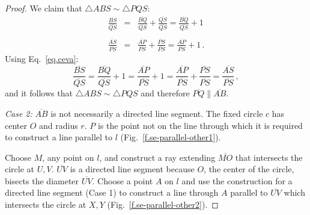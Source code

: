 \begin{proof}
We claim that $\triangle ABS \sim \triangle PQS$:
\begin{eqnarray*}
\frac{\overline{BS}}{\overline{QS}}&=&\frac{\overline{BQ}}{\overline{QS}}+\frac{\overline{QS}}{\overline{QS}} = \frac{\overline{BQ}}{\overline{QS}}+1\\
&&\\
\frac{\overline{AS}}{\overline{PS}} &=& \frac{\overline{AP}}{\overline{PS}} + \frac{\overline{PS}}{\overline{PS}} = \frac{\overline{AP}}{\overline{PS}} + 1\,.
\end{eqnarray*}
Using Eq.~\ref{eq.ceva}:
\[
\frac{\overline{BS}}{\overline{QS}}=\frac{\overline{BQ}}{\overline{QS}}+1=\frac{\overline{AP}}{\overline{PS}}+1=\frac{\overline{AP}}{\overline{PS}}+\frac{\overline{PS}}{\overline{PS}}=\frac{\overline{AS}}{\overline{PS}}\,,
\]
and it follows that $\triangle ABS \sim \triangle PQS$ and therefore $\overline{PQ}\parallel\overline{AB}$.

\textit{Case 2:}
$\overline{AB}$ is not necessarily a directed line segment. The fixed circle $c$ has center $O$ and radius $r$. $P$ is the point not on the line through which it is required to construct a line parallel to $l$ (Fig.~\ref{f.se-parallel-other1}).

Choose $M$, any point on $l$, and construct a ray extending $\overline{MO}$ that intersects the circle at $U,V$.
$\overline{UV}$ is a directed line segment because $O$, the center of the circle, bisects the diameter $\overline{UV}$. Choose a point $A$ on $l$ and use the construction for a directed line segment (Case 1) to construct a line through $A$ parallel to $\overline{UV}$ which intersects the circle at $X,Y$ (Fig.~\ref{f.se-parallel-other2}).


\end{proof}

